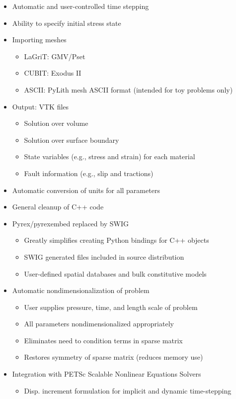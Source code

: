 \documentclass[pdftex,cig,slideColor]{pp4slides}
\newcommand{\newfeature}[1]{{\color{blue}#1}}
\begin{document}
  \begin{itemize}
  \item Automatic and user-controlled time stepping
  \item Ability to specify initial stress state
  \item Importing meshes
    \begin{itemize}
    \item LaGriT: GMV/Pset
    \item CUBIT: Exodus II
    \item ASCII: PyLith mesh ASCII format (intended for toy problems only)
    \end{itemize}
  \item Output: VTK files
    \begin{itemize}
    \item Solution over volume
    \item Solution over surface boundary
    \item State variables (e.g., stress and strain) for each material
    \item Fault information (e.g., slip and tractions)
    \end{itemize}
  \item \newfeature{Automatic conversion of units for all parameters}
  \end{itemize}

  \summary{}

  \begin{itemize}
  \item General cleanup of C++ code
  \item Pyrex/pyrexembed replaced by SWIG
    \begin{itemize}
    \item Greatly simplifies creating Python bindings for C++ objects
    \item SWIG generated files included in source distribution
    \item User-defined spatial databases and bulk constitutive models
    \end{itemize}
  \item Automatic nondimensionalization of problem
    \begin{itemize}
    \item User supplies pressure, time, and length scale of problem
    \item All parameters nondimensionalized appropriately
    \item Eliminates need to condition terms in sparse matrix
    \item Restores symmetry of sparse matrix (reduces memory use)
    \end{itemize}
  \item Integration with PETSc Scalable Nonlinear Equations Solvers
   \begin{itemize}
    \item Disp. increment formulation for implicit and dynamic time-stepping
   \end{itemize}
  \end{itemize}
    
\end{document}
